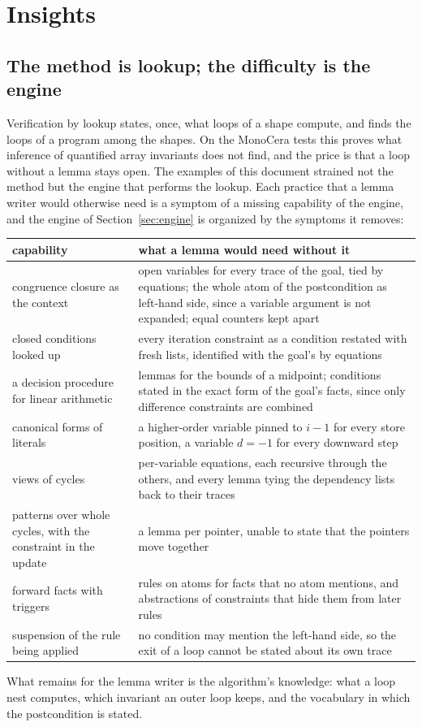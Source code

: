 \section{Insights}\label{sec:conclusion}

\subsection{The method is lookup; the difficulty is the engine}
Verification by lookup states, once, what loops of a shape compute, and finds the loops of a program among the shapes.
On the MonoCera tests this proves what inference of quantified array invariants does not find, and the price is that a loop without a lemma stays open. The examples of this document strained not
the method but the engine that performs the lookup. Each practice that a lemma writer would otherwise need is a
symptom of a missing capability of the engine, and the engine of Section~\ref{sec:engine} is organized by the
symptoms it removes:
\begin{center}\small
\begin{tabular}{@{}p{}p{}@{}}
\toprule
capability & what a lemma would need without it \\
\midrule
congruence closure as the context & open variables for every trace of the goal, tied by equations; the whole atom of the
  postcondition as left-hand side, since a variable argument is not expanded; equal counters kept apart \\
closed conditions looked up & every iteration constraint as a condition restated with fresh lists, identified with the
  goal's by equations \\
a decision procedure for linear arithmetic & lemmas for the bounds of a midpoint; conditions stated in the exact form of
  the goal's facts, since only difference constraints are combined \\
canonical forms of literals & a higher-order variable pinned to $i - 1$ for every store position, a variable $d = -1$ for
  every downward step \\
views of cycles & per-variable equations, each recursive through the others, and every lemma tying the dependency lists
  back to their traces \\
patterns over whole cycles, with the constraint in the update & a lemma per pointer, unable to state that the
  pointers move together \\
forward facts with triggers & rules on atoms for facts that no atom mentions, and abstractions of constraints that hide
  them from later rules \\
suspension of the rule being applied & no condition may mention the left-hand side, so the exit of a loop cannot be
  stated about its own trace \\
\bottomrule
\end{tabular}
\end{center}
What remains for the lemma writer is the algorithm's knowledge: what a loop nest computes, which invariant an outer
loop keeps, and the vocabulary in which the postcondition is stated.


